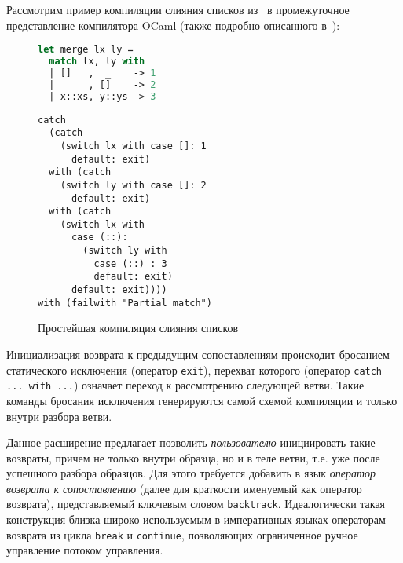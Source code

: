 Рассмотрим пример компиляции слияния списков из~\cite{fessant2001optimizing} в промежуточное представление компилятора OCaml (также подробно описанного в~\cite{fessant2001optimizing}):

\noindent
\begin{minipage}{\textwidth}
  \begin{figure}[H]
    \begin{minipage}{0.40\textwidth}
\begin{lstlisting}[language=ocaml]
let merge lx ly = 
  match lx, ly with
  | []   ,  _    -> 1
  | _    , []    -> 2
  | x::xs, y::ys -> 3
\end{lstlisting}
    \end{minipage}
  \centering
    \begin{minipage}{0.55\textwidth}
\begin{lstlisting}[language=lambda]
catch
  (catch
    (switch lx with case []: 1
      default: exit)
  with (catch
    (switch ly with case []: 2
      default: exit)
  with (catch
    (switch lx with
      case (::):
        (switch ly with
          case (::) : 3
          default: exit)
      default: exit))))
with (failwith "Partial match")
\end{lstlisting}
    \end{minipage}
    
  \captionsetup{justification=centering}
  \caption{Простейшая компиляция слияния списков}
  \label{fig:simple_match}
  \end{figure}
\end{minipage}

\bigskip

Инициализация возврата к предыдущим сопоставлениям происходит бросанием статического исключения (оператор \lstinline|exit|), перехват которого (оператор \lstinline[language=none,breaklines]|catch ... with ...|) означает переход к рассмотрению следующей ветви. Такие команды бросания исключения генерируются самой схемой компиляции и только внутри разбора ветви.

Данное расширение предлагает позволить \textit{пользователю} инициировать такие возвраты, причем не только внутри образца, но и в теле ветви, т.е. уже после успешного разбора образцов. Для этого требуется добавить в язык \textit{оператор возврата к сопоставлению} (далее для краткости именуемый как оператор возврата), представляемый ключевым словом \lstinline|backtrack|. Идеалогически такая конструкция близка широко используемым в императивных языках операторам возврата из цикла \lstinline|break| и \lstinline|continue|, позволяющих ограниченное ручное управление потоком управления. 

